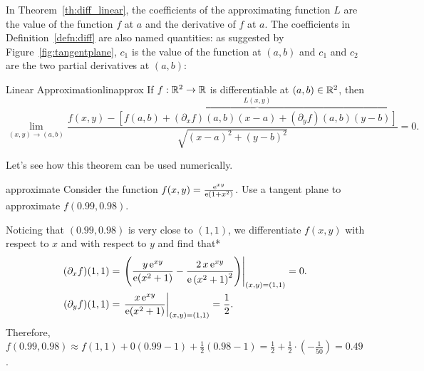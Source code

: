\documentclass{watsonbook}
\begin{document}
  In Theorem~\ref{th:diff_linear}, the coefficients of the
  approximating function $L$ are the value of the function $f$ at $a$
  and the derivative of $f$ at $a$. The coefficients in
  Definition~\ref{defn:diff} are also named quantities: as suggested
  by Figure~\ref{fig:tangentplane}, $c_1$ is the value of the function
  at $(a,b)$ and $c_1$ and $c_2$ are the two partial derivatives at
  $(a,b)$:

  \vspace{12pt} 

  \begin{theo}{Linear Approximation}{linapprox}
    If $f: \mathbb{R}^2 \to \mathbb{R}$ is differentiable at $(a,b) \in \mathbb{R}^2$, then
    \[
      \lim_{(x,y) \to (a,b)}\frac{f(x,y) - \overbrace{\left[f(a,b) + (\partial_x
        f)(a,b)(x-a) + (\partial_y
        f)(a,b)(y-b)\right]}^{L(x,y)}}{\sqrt{(x-a)^2 + (y-b)^2}} = 0.
    \]
  \end{theo} \bang{-2cm} 

  Let's see how this theorem can be used numerically. 

  \begin{example}{}{approximate}
    Consider the function $f(x,y) = \frac{\operatorname{e}^{xy}}{\operatorname{e}(1+x^2)}$. Use a
    tangent plane to approximate $f(0.99,0.98)$.
  \end{example}

  \begin{solution}
    Noticing that $(0.99,0.98)$ is very close to $(1,1)$, we
    differentiate $f(x,y)$ with respect to $x$ and with respect to $y$ and
    find that* 
    \begin{align*}
      (\partial_x f)(1,1) &= \left.\left(
                            \frac{y \operatorname{e}^{x y}}{\operatorname{e}(x^{2} + 1)} -
                            \frac{2 \, x \operatorname{e}^{xy}}{{\operatorname{e}\left(x^{2} +
                            1\right)}^{2}}\right)\right|_{(x,y)
                            =(1,1)} = 0. \\
      (\partial_y f)(1,1) &=    \left.\frac{x \operatorname{e}^{x y}}{\operatorname{e}(x^{2} +
                            1)}\right|_{(x,y) = (1,1)} = \frac{1}{2}. 
    \end{align*}
    Therefore, $f(0.99,0.98) \approx f(1,1) + 0(0.99-1) +
    \frac{1}{2}(0.98-1) = \frac{1}{2} + \frac{1}{2} \cdot
    (-\frac{1}{50}) = 0.49$.  
  \end{solution}
\end{document}
